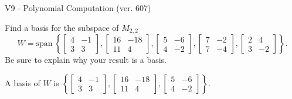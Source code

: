 \begin{exercise}
  \begin{exerciseTitle}V9 - Polynomial Computation (ver. 607)\end{exerciseTitle}
  \begin{exerciseStatement}
    Find a basis for the subspace of \(M_{2,2}\) 
\[W=\mathrm{span}\ \left\{\left[\begin{array}{cc}
4 & -1 \\
3 & 3
\end{array}\right] , \left[\begin{array}{cc}
16 & -18 \\
11 & 4
\end{array}\right] , \left[\begin{array}{cc}
5 & -6 \\
4 & -2
\end{array}\right] , \left[\begin{array}{cc}
7 & -2 \\
7 & -4
\end{array}\right] , \left[\begin{array}{cc}
2 & 4 \\
3 & -2
\end{array}\right]\right\}.\]
 Be sure to explain why your result is a basis.


  \end{exerciseStatement}
  \begin{exerciseAnswer}
   A basis of \(W\) is  \(\left\{\left[\begin{array}{cc}
4 & -1 \\
3 & 3
\end{array}\right] , \left[\begin{array}{cc}
16 & -18 \\
11 & 4
\end{array}\right] , \left[\begin{array}{cc}
5 & -6 \\
4 & -2
\end{array}\right]\right\}\).
  


  \end{exerciseAnswer}
\end{exercise}